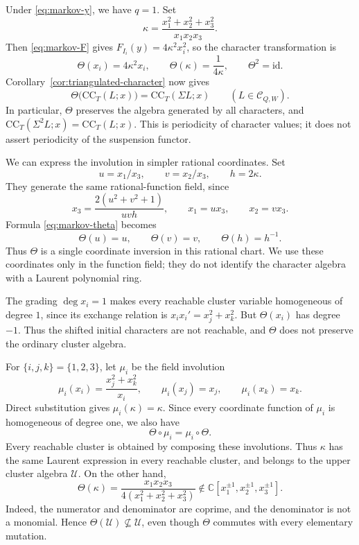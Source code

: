 \documentclass[11pt]{amsart}
\numberwithin{equation}{section}
\theoremstyle{definition}
\theoremstyle{remark}
\newcommand{\CC}{\mathrm{CC}}
\newcommand{\kk}{\mathbb C}
\begin{document}
Under \eqref{eq:markov-y}, we have $q=1$. Set
\[ \kappa=\frac{x_1^2+x_2^2+x_3^2}{x_1x_2x_3}. \]
Then \eqref{eq:markov-F} gives $F_{I_i}(y)=4\kappa^2x_i^2$, so the
character transformation is
\begin{equation}\label{eq:markov-theta} \Theta(x_i)=4\kappa^2x_i,\qquad \Theta(\kappa)=\frac1{4\kappa},\qquad \Theta^2=\mathrm{id}.\end{equation}
Corollary~\ref{cor:triangulated-character} now gives
\begin{equation}\label{eq:markov-covariance} \Theta\bigl(\CC_T(L;x)\bigr)=\CC_T(\Sigma L;x)\qquad(L\in\mathcal C_{Q,W}).\end{equation}
In particular, $\Theta$ preserves the algebra generated by all characters,
and $\CC_T(\Sigma^2L;x)=\CC_T(L;x)$. This is periodicity of character
values; it does not assert periodicity of the suspension functor.

We can express the involution in simpler rational coordinates. Set
\begin{equation}\label{eq:markov-ratio-coordinates} u=x_1/x_3,\qquad v=x_2/x_3,\qquad h=2\kappa.\end{equation}
They generate the same rational-function field, since
\[ x_3=\frac{2(u^2+v^2+1)}{uvh},\qquad x_1=ux_3,\qquad x_2=vx_3. \]
Formula \eqref{eq:markov-theta} becomes
\begin{equation}\label{eq:markov-inversion} \Theta(u)=u,\qquad \Theta(v)=v,\qquad \Theta(h)=h^{-1}.\end{equation}
Thus $\Theta$ is a single coordinate inversion in this rational chart.
We use these coordinates only in the function field; they do not
identify the character algebra with a Laurent polynomial ring.

The grading $\deg x_i=1$ makes every reachable cluster variable
homogeneous of degree $1$, since its exchange relation is
$x_ix_i'=x_j^2+x_k^2$. But $\Theta(x_i)$ has degree $-1$.
Thus the shifted initial characters are not reachable, and $\Theta$
does not preserve the ordinary cluster algebra.

For $\{i,j,k\}=\{1,2,3\}$, let $\mu_i$ be the field involution
\[ \mu_i(x_i)=\frac{x_j^2+x_k^2}{x_i},\qquad \mu_i(x_j)=x_j,\qquad \mu_i(x_k)=x_k. \]
Direct substitution gives $\mu_i(\kappa)=\kappa$. Since every coordinate
function of $\mu_i$ is homogeneous of degree one, we also have
\[ \Theta\circ\mu_i=\mu_i\circ\Theta. \]
Every reachable cluster is obtained by composing these involutions.
Thus $\kappa$ has the same Laurent expression in every reachable cluster,
and belongs to the upper cluster algebra $\mathcal U$. On the other hand,
\[ \Theta(\kappa)=\frac{x_1x_2x_3}{4(x_1^2+x_2^2+x_3^2)} \notin\kk[x_1^{\pm1},x_2^{\pm1},x_3^{\pm1}]. \]
Indeed, the numerator and denominator are coprime, and the denominator is
not a monomial. Hence $\Theta(\mathcal U)\not\subseteq\mathcal U$,
even though $\Theta$ commutes with every elementary mutation.
\end{document}
